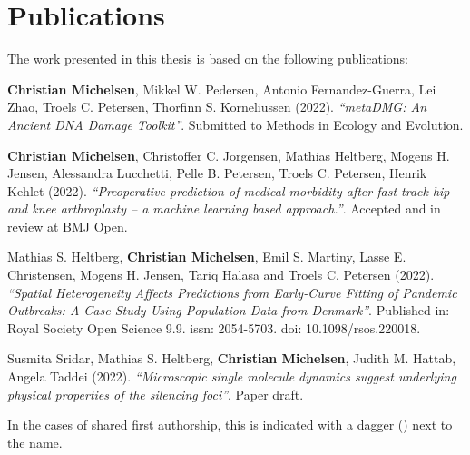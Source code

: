 \chapter{Publications}

The work presented in this thesis is based on the following publications:

\vspace{1.5cm}

\begin{description} [labelindent=1cm,style=multiline,leftmargin=3cm]
    \item [Paper 1:] \textbf{Christian Michelsen}\textsuperscript{\textdagger}, Mikkel W. Pedersen\textsuperscript{\textdagger}, Antonio Fernandez-Guerra, Lei Zhao, Troels C. Petersen, Thorfinn S. Korneliussen (2022). \emph{``metaDMG: An Ancient DNA Damage Toolkit''}. Submitted to Methods in Ecology and Evolution. \\
    \item [Paper 2:] \textbf{Christian Michelsen}\textsuperscript{\textdagger}, Christoffer C. Jorgensen\textsuperscript{\textdagger}, Mathias Heltberg, Mogens H. Jensen, Alessandra Lucchetti, Pelle B. Petersen, Troels C. Petersen, Henrik Kehlet (2022). \emph{``Preoperative prediction of medical morbidity after fast-track hip and knee arthroplasty -- a machine learning based approach.''}. Accepted and in review at BMJ Open. \\
    \item [Paper 3:] Mathias S. Heltberg\textsuperscript{\textdagger}, \textbf{Christian Michelsen}\textsuperscript{\textdagger}, Emil S. Martiny, Lasse E. Christensen, Mogens H. Jensen, Tariq Halasa and Troels C. Petersen (2022). \emph{``Spatial Heterogeneity Affects Predictions from Early-Curve Fitting of Pandemic Outbreaks: A Case Study Using Population Data from Denmark''}. Published in: Royal Society Open Science 9.9. issn: 2054-5703. doi: 10.1098/rsos.220018. \\
    \item [Paper 4:] Susmita Sridar\textsuperscript{\textdagger}, Mathias S. Heltberg\textsuperscript{\textdagger}, \textbf{Christian Michelsen}\textsuperscript{\textdagger}, Judith M. Hattab, Angela Taddei (2022). \emph{``Microscopic single molecule dynamics suggest underlying physical properties of the silencing foci''}. Paper draft.
\end{description}

\vspace{1cm}
\noindent In the cases of shared first authorship, this is indicated with a dagger (\textdagger) next to the name.

